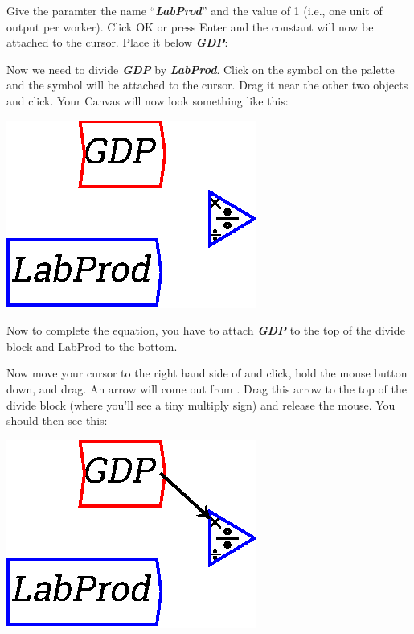 Give the paramter the name ``{\em\bf LabProd}'' and the value of 1
(i.e., one unit of output per worker). Click OK or press Enter and the
constant   will now be attached to the
cursor. Place it below {\em\bf GDP}: 

\begin{center}
\end{center}

Now we need to divide {\em\bf GDP} by {\em\bf LabProd}. Click on the
 symbol on the palette and the symbol will
be attached to the cursor. Drag it near the other two objects and
click. Your Canvas will now look something like this: 

\begin{center}
\includegraphics{images/NewItem70.eps} 
\end{center}

Now to complete the equation, you have to attach {\em\bf GDP}  to the top of the
divide block and LabProd to the bottom.

Now move your cursor to the right hand side of
  and click, hold the mouse button down, and
drag. An arrow will come out from  . Drag
this arrow to the top of the divide block (where you'll see a tiny
multiply sign) and release the mouse. You should then see this: 

\begin{center}
\includegraphics{images/NewItem74.eps} 
\end{center}


